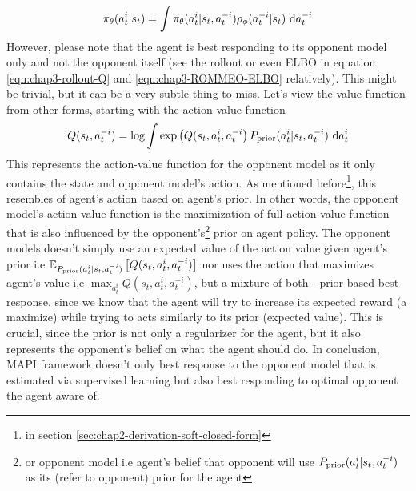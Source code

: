 \begin{equation}
\label{eqn:chap3-ROMMEO-execute-action}
\pi_\theta(a^i_t |s_t) = \int \pi_\theta(a^i_t | s_t, a^{-i}_t) \rho_\phi(a^{-i}_t | s_t) \ \mathrm{d} a^{-i}_t 
\end{equation}
However, please note that the agent is best responding to its opponent model only and not the opponent itself (see the rollout or even ELBO in equation \ref{eqn:chap3-rollout-Q} and \ref{eqn:chap3-ROMMEO-ELBO} relatively). This might be trivial, but it can be a very subtle thing to miss. Let's view the value function from other forms, starting with the action-value function 
\begin{equation}
    Q(s_t, a^{-i}_t) = \log \int \exp \left( Q(s_t, a^i_t, a^{-i}_t \right)P_{\text{prior}}(a^i_t | s_t, a^{-i}_t)  \ \mathrm{d} a^i_t 
\end{equation}
This represents the action-value function for the opponent model as it only contains the state and opponent model's action. As mentioned before\footnote{in section \ref{sec:chap2-derivation-soft-closed-form}}, this resembles  of agent's action based on agent's prior. In other words, the opponent model's action-value function is the maximization of full action-value function that is also influenced by the opponent's\footnote{or opponent model i.e agent's belief that opponent will use $P_{\text{prior}} (a^i_t | s_t, a^{-i}_t)$ as its (refer to opponent) prior for the agent} prior on agent policy. The opponent models doesn't simply use an expected value of the action value given agent's prior i.e $\mathbb{E}_{P_{\text{prior}} (a^i_t | s_t, a^{-i}_t)}\left[ Q(s_t, a^i_t, a^{-i}_t) \right]$ nor uses the action that maximizes agent's value i,e $\max_{a^i_t} Q(s_t, a^i_t, a^{-i}_t)$, but a mixture of both - prior based best response, since we know that the agent will try to increase its expected reward (a maximize) while trying to acts similarly to its prior (expected value). This is crucial, since the prior is not only a regularizer for the agent, but it also represents the opponent's belief on what the agent should do. In conclusion, MAPI framework doesn't only best response to the opponent model that is estimated via supervised learning but also best responding to optimal opponent the agent aware of.

